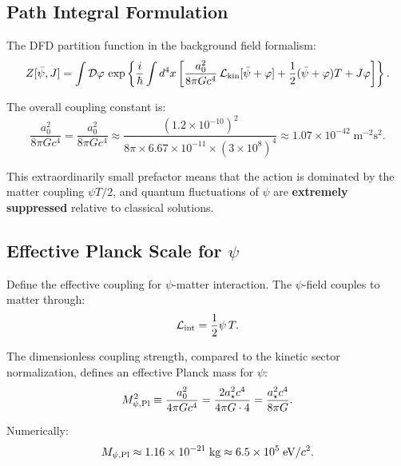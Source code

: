 \documentclass[11pt,a4paper]{article}
\begin{document}
\subsection{Path Integral Formulation}
\label{sec:path-integral}

The DFD partition function in the background field formalism:
\begin{equation}\label{eq:path-integral}
Z[\bar\psi, J] = \int \mathcal{D}\varphi\,\exp\left\{
\frac{i}{\hbar}\int d^4x\left[
\frac{a_0^2}{8\pi G c^4}\,\mathcal{L}_{\rm kin}[\bar\psi+\varphi]
+ \frac{1}{2}(\bar\psi+\varphi)T + J\varphi
\right]\right\}.
\end{equation}

The overall coupling constant is:
\begin{equation}
\frac{a_0^2}{8\pi G c^4} = \frac{a_0^2}{8\pi G c^4}
\approx \frac{(1.2\times 10^{-10})^2}{8\pi \times 6.67\times 10^{-11} \times (3\times 10^8)^4}
\approx 1.07 \times 10^{-42}\;\text{m}^{-2}\text{s}^2.
\end{equation}

This extraordinarily small prefactor means that the action is dominated by the matter coupling $\psi T/2$, and quantum fluctuations of $\psi$ are \textbf{extremely suppressed} relative to classical solutions.

\subsection{Effective Planck Scale for $\psi$}
\label{sec:psi-planck}

Define the effective coupling for $\psi$-matter interaction. The $\psi$-field couples to matter through:
\begin{equation}
\mathcal{L}_{\rm int} = \frac{1}{2}\psi\,T.
\end{equation}

The dimensionless coupling strength, compared to the kinetic sector normalization, defines an effective Planck mass for $\psi$:
\begin{equation}\label{eq:M-psi-Planck}
M_{\psi,\rm Pl}^2 \equiv \frac{a_0^2}{4\pi G c^4}
= \frac{2a_\star^2 c^4}{4\pi G \cdot 4}
= \frac{a_\star^2 c^4}{8\pi G}.
\end{equation}

Numerically:
\begin{equation}
M_{\psi,\rm Pl} \approx 1.16 \times 10^{-21}\;\text{kg}
\approx 6.5 \times 10^{5}\;\text{eV}/c^2.
\end{equation}
\end{document}
